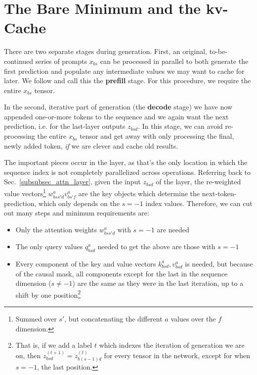 \documentclass[11pt]{article}
\begin{document}
\section{The Bare Minimum and the kv-Cache \label{sec_kv_cache}}


There are two separate stages during generation. First, an original, to-be-continued series of prompts
$ x _{ bs }  $ can be processed in parallel to both generate the first prediction and populate any
intermediate values we may want to cache for later. We follow \cite{pope2022efficiently} and call this the
\textbf{prefill} stage. For this procedure, we require the entire $ x _{ bs } $ tensor.

In the second, iterative part of generation (the \textbf{decode} stage) we have now appended
one-or-more tokens to the sequence and we again want the next prediction, i.e. 
for the last-layer outputs $ z _{ bsd } $. In this stage, we can avoid re-processing the entire $ x
_{ bs } $ tensor and get away with only processing the final, newly added token, \textit{if} we are
clever and cache old results.

The important pieces occur in the  layer, as that's the only location in
which the sequence index is not completely parallelized across operations. Referring back to
Sec.~\ref{subsubsec_attn_layer}, given the input $ z _{ bsd } $ of the 
layer, the re-weighted value vectors\footnote{Summed over $ s' $, but concatenating the different $
a $ values over the $ f $ dimension.} $ w ^{ a }_{ bss'd } v ^{ a } _{ bs'f } $ are the key objects
which determine the next-token-prediction, which only depends on the $ s=-1 $ index values.
Therefore, we can cut out many steps and minimum requirements are:
\begin{itemize}
    \item Only the attention weights $ w ^{ a }_{ bss'd }$ with $ s=-1 $ are needed
    \item The only query values $ q ^{ a }_{ bsd } $ needed to get the above are those with $ s=-1 $
    \item Every component of the key and value vectors $k ^{ a }_{ bsd }, v ^{ a }_{ bsd } $ is
        needed, but because of the causal mask, all components except for the last in the sequence
        dimension ($ s\neq -1 $) are the same as they were in the last iteration, up to a shift
        by one position\footnote{That is, if we add a label $ t $ which indexes the iteration of generation
        we are on, then $ z ^{ (t+1) } _{ bsd } = z ^{ (t)} _{ b (s-1)d } $ for every tensor in the network, except for when $ s=-1 $, the last position.}
\end{itemize}
\end{document}
